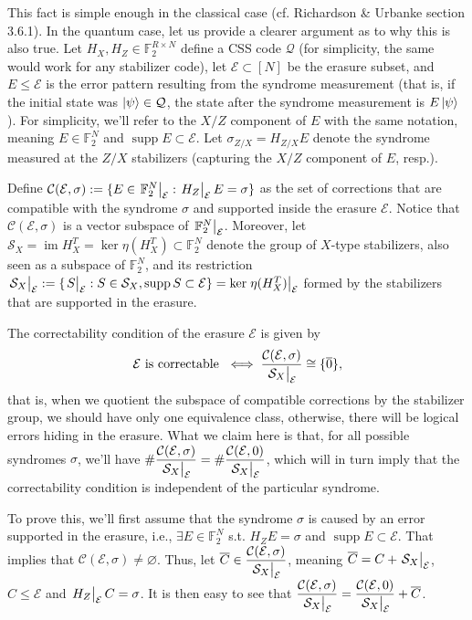 \documentclass{article}
\DeclareMathOperator{\im}{im}
\DeclareMathOperator\supp{supp}
\begin{document}
This fact is simple enough in the classical case (cf. Richardson \& Urbanke section 3.6.1). In the quantum case, let us provide a clearer argument as to why this is also true. Let $H_X, H_Z \in \mathbb{F}_2^{R\times N}$ define a CSS code $\mathcal{Q}$ (for simplicity, the same would work for any stabilizer code), let $\mathcal{E} \subset [N]$ be the erasure subset, and $E \le \mathcal{E}$ is the error pattern resulting from the syndrome measurement (that is, if the initial state was $\ket{\psi} \in \mathcal{Q}$, the state after the syndrome measurement is $E \ket{\psi}$). For simplicity, we'll refer to the $X/Z$ component of $E$ with the same notation, meaning $E \in \mathbb{F}_2^N$ and $\supp{E} \subset \mathcal{E}$. Let $\sigma_{Z/X} = H_{Z/X} E$ denote the syndrome measured at the $Z/X$ stabilizers (capturing the $X/Z$ component of $E$, resp.). 

Define $\mathcal{C}(\mathcal{E}, \sigma) := \{E \in \eval{\mathbb{F}_2^N}_{\mathcal{E}} : \eval{H_Z}_{\mathcal{E}} E = \sigma\}$ as the set of corrections that are compatible with the syndrome $\sigma$ and supported inside the erasure $\mathcal{E}$. Notice that $\mathcal{C}(\mathcal{E}, \sigma)$ is a vector subspace of $\eval{\mathbb{F}_2^N}_{\mathcal{E}}$. Moreover, let $\mathcal{S}_X = \im{H_X^T} = \ker{\eta(H_X^T)} \subset \mathbb{F}_2^N$ denote the group of $X$-type stabilizers, also seen as a subspace of $\mathbb{F}_2^N$, and its restriction $\eval{\mathcal{S}_X}_{\mathcal{E}} := \{ \eval{S}_{\mathcal{E}} : S \in \mathcal{S}_X, \supp{S} \subset \mathcal{E} \} = \ker \eval{\eta(H_X^T)}_{\mathcal{E}}$ formed by the stabilizers that are supported in the erasure. 

The correctability condition of the erasure $\mathcal{E}$ is given by
$$
\mathcal{E} \text{ is correctable } \iff \dfrac{\mathcal{C}(\mathcal{E}, \sigma)}{\eval{\mathcal{S}_X}_{\mathcal{E}}} \cong \{\overline{0}\},
$$
that is, when we quotient the subspace of compatible corrections by the stabilizer group, we should have only one equivalence class, otherwise, there will be logical errors hiding in the erasure. What we claim here is that, for all possible syndromes $\sigma$, we'll have $\# \dfrac{\mathcal{C}(\mathcal{E}, \sigma)}{\eval{\mathcal{S}_X}_{\mathcal{E}}} = \# \dfrac{\mathcal{C}(\mathcal{E}, 0)}{\eval{\mathcal{S}_X}_{\mathcal{E}}}$, which will in turn imply that the correctability condition is independent of the particular syndrome. 

To prove this, we'll first assume that the syndrome $\sigma$ is caused by an error supported in the erasure, i.e., $\exists E \in \mathbb{F}_2^N$ s.t. $H_Z E = \sigma$ and $\supp E \subset \mathcal{E}$. That implies that $\mathcal{C}(\mathcal{E}, \sigma) \neq \varnothing$. Thus, let $\overline{C} \in \dfrac{\mathcal{C}(\mathcal{E}, \sigma)}{\eval{\mathcal{S}_X}_{\mathcal{E}}}$, meaning $\overline{C} = C + \eval{\mathcal{S}_X}_{\mathcal{E}}$, $C \le \mathcal{E}$ and $\eval{H_Z}_{\mathcal{E}} C = \sigma$. It is then easy to see that $\dfrac{\mathcal{C}(\mathcal{E}, \sigma)}{\eval{\mathcal{S}_X}_{\mathcal{E}}} = \dfrac{\mathcal{C}(\mathcal{E}, 0)}{\eval{\mathcal{S}_X}_{\mathcal{E}}} + \overline{C}$. 
\end{document}
